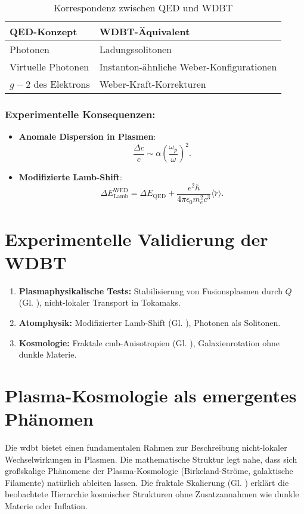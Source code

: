 \begin{table}[ht]
\centering
\begin{tabular}{ll}
\toprule
\textbf{QED-Konzept} & \textbf{WDBT-Äquivalent} \\
\midrule
Photonen & Ladungssolitonen \\
Virtuelle Photonen & Instanton-ähnliche Weber-Konfigurationen \\
$g-2$ des Elektrons & Weber-Kraft-Korrekturen \\
\bottomrule
\end{tabular}
\caption{Korrespondenz zwischen QED und WDBT}
\end{table}

\subsubsection{Experimentelle Konsequenzen:}

\begin{itemize}
    \item \textbf{Anomale Dispersion in Plasmen}:  
    \begin{equation}
    \frac{\Delta c}{c} \sim \alpha \left(\frac{\omega_p}{\omega}\right)^2.
    \end{equation}
    \item \textbf{Modifizierte Lamb-Shift}:
    \begin{equation}
        \label{eq:lamb_shift}
        \Delta E_{\text{Lamb}}^{\text{WED}} = \Delta E_{\text{QED}} + \frac{e^2 \hbar}{4\pi \epsilon_0 m_e^2 c^3} \langle \ddot{r} \rangle.
    \end{equation}
\end{itemize}

\section{Experimentelle Validierung der WDBT}
\label{sec:experimentelle_konsequenzen}

\begin{enumerate}
    \item \textbf{Plasmaphysikalische Tests:} Stabilisierung von Fusionsplasmen durch $Q$ (Gl. ), nicht-lokaler Transport in Tokamaks.
    \item \textbf{Atomphysik:} Modifizierter Lamb-Shift (Gl. ), Photonen als Solitonen.
    \item \textbf{Kosmologie:} Fraktale \gls{cmb}-Anisotropien (Gl. ), Galaxienrotation ohne dunkle Materie.
\end{enumerate}

\section{Plasma-Kosmologie als emergentes Phänomen}
Die \gls{wdbt} bietet einen fundamentalen Rahmen zur Beschreibung nicht-lokaler Wechselwirkungen in Plasmen. Die mathematische Struktur legt nahe, dass sich großskalige Phänomene der Plasma-Kosmologie
(Birkeland-Ströme, galaktische Filamente) natürlich ableiten lassen. Die fraktale Skalierung (Gl. ) erklärt die beobachtete Hierarchie kosmischer Strukturen ohne
Zusatzannahmen wie dunkle Materie oder Inflation.
